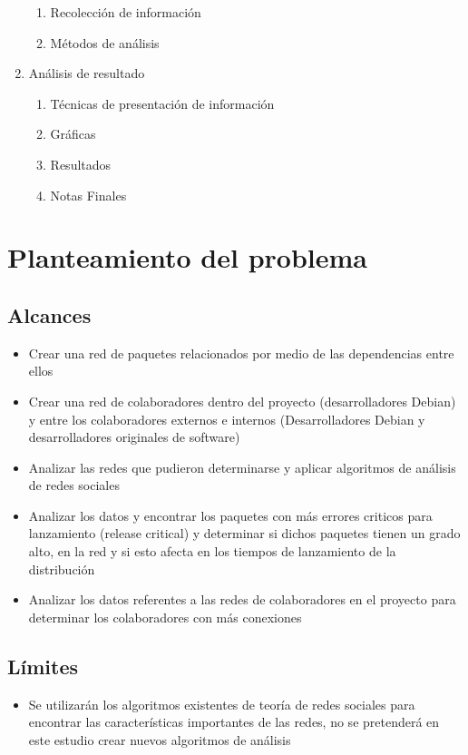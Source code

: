 \documentclass[12pt,titlepage]{report}
\begin{document}
\begin{enumerate}
\begin{enumerate}
  \item Recolección de información
  \item Métodos de análisis
  \end{enumerate}
\item Análisis de resultado
  \begin{enumerate}
  \item Técnicas de presentación de información
  \item Gráficas
  \item Resultados
  \item Notas Finales
  \end{enumerate}
\end{enumerate}

\section{Planteamiento del problema}
\subsection{Alcances} 
\begin{itemize}
\item  Crear  una  red  de  paquetes relacionados  por  medio  de  las
dependencias entre ellos
\item   Crear   una  red   de   colaboradores   dentro  del   proyecto
(desarrolladores Debian) y entre los colaboradores externos e internos
(Desarrolladores Debian y desarrolladores originales de software)
\item  Analizar   las  redes  que  pudieron   determinarse  y  aplicar
algoritmos de análisis de redes sociales
\item  Analizar los  datos y  encontrar los  paquetes con  más errores
criticos para  lanzamiento (release  critical) y determinar  si dichos
paquetes tienen  un grado  alto, en  la red  y si  esto afecta  en los
tiempos de lanzamiento de la distribución
\item Analizar los datos referentes a las redes de colaboradores en el
proyecto para determinar los colaboradores con más conexiones
\end{itemize}
\subsection{Límites}
\begin{itemize}
\item  Se utilizarán  los  algoritmos existentes  de  teoría de  redes
  sociales  para  encontrar  las características  importantes  de  las
  redes, no se  pretenderá en este estudio crear  nuevos algoritmos de
  análisis
\end{itemize}
\end{document}
